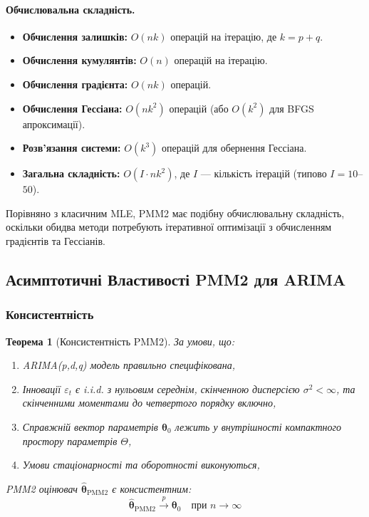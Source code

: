 \documentclass[12pt,a4paper]{article}
\newtheorem{theorem}{Теорема}[section]
\begin{document}
\paragraph{Обчислювальна складність.}

\begin{itemize}
    \item \textbf{Обчислення залишків:} $O(nk)$ операцій на ітерацію, де $k = p + q$.

    \item \textbf{Обчислення кумулянтів:} $O(n)$ операцій на ітерацію.

    \item \textbf{Обчислення градієнта:} $O(nk)$ операцій.

    \item \textbf{Обчислення Гессіана:} $O(nk^2)$ операцій (або $O(k^2)$ для BFGS апроксимації).

    \item \textbf{Розв'язання системи:} $O(k^3)$ операцій для обернення Гессіана.

    \item \textbf{Загальна складність:} $O(I \cdot nk^2)$, де $I$ --- кількість ітерацій (типово $I = 10$--$50$).
\end{itemize}

Порівняно з класичним MLE, PMM2 має подібну обчислювальну складність, оскільки обидва методи потребують ітеративної оптимізації з обчисленням градієнтів та Гессіанів.

\subsection{Асимптотичні Властивості PMM2 для ARIMA}
\label{subsec:asymptotic_theory}

\subsubsection{Консистентність}

\begin{theorem}[Консистентність PMM2]
\label{thm:consistency}
За умови, що:
\begin{enumerate}
    \item ARIMA(p,d,q) модель правильно специфікована,
    \item Інновації $\varepsilon_t$ є i.i.d. з нульовим середнім, скінченною дисперсією $\sigma^2 < \infty$, та скінченними моментами до четвертого порядку включно,
    \item Справжній вектор параметрів $\boldsymbol{\theta}_0$ лежить у внутрішності компактного простору параметрів $\Theta$,
    \item Умови стаціонарності та оборотності виконуються,
\end{enumerate}
PMM2 оцінювач $\hat{\boldsymbol{\theta}}_{\text{PMM2}}$ є консистентним:
\begin{equation}
\label{eq:consistency}
\hat{\boldsymbol{\theta}}_{\text{PMM2}} \xrightarrow{p} \boldsymbol{\theta}_0 \quad \text{при } n \to \infty
\end{equation}
\end{theorem}
\end{document}
